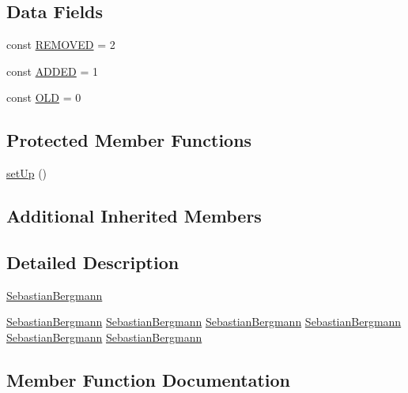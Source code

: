 \subsection*{Data Fields}
\begin{DoxyCompactItemize}
\item 
const \mbox{\hyperlink{class_sebastian_bergmann_1_1_diff_1_1_differ_test_a407d200e9f16e51a21be57a9fcec09f0}{R\+E\+M\+O\+V\+ED}} = 2
\item 
const \mbox{\hyperlink{class_sebastian_bergmann_1_1_diff_1_1_differ_test_a9dcf44632176616f583582396a5d6ec9}{A\+D\+D\+ED}} = 1
\item 
const \mbox{\hyperlink{class_sebastian_bergmann_1_1_diff_1_1_differ_test_aa3c960620355380babe787deab5a9b4e}{O\+LD}} = 0
\end{DoxyCompactItemize}
\subsection*{Protected Member Functions}
\begin{DoxyCompactItemize}
\item 
\mbox{\hyperlink{class_sebastian_bergmann_1_1_diff_1_1_differ_test_a0bc688732d2b3b162ffebaf7812e78da}{set\+Up}} ()
\end{DoxyCompactItemize}
\subsection*{Additional Inherited Members}


\subsection{Detailed Description}
\mbox{\hyperlink{namespace_sebastian_bergmann}{Sebastian\+Bergmann}}

\mbox{\hyperlink{namespace_sebastian_bergmann}{Sebastian\+Bergmann}}  \mbox{\hyperlink{namespace_sebastian_bergmann}{Sebastian\+Bergmann}}  \mbox{\hyperlink{namespace_sebastian_bergmann}{Sebastian\+Bergmann}}  \mbox{\hyperlink{namespace_sebastian_bergmann}{Sebastian\+Bergmann}}  \mbox{\hyperlink{namespace_sebastian_bergmann}{Sebastian\+Bergmann}}  \mbox{\hyperlink{namespace_sebastian_bergmann}{Sebastian\+Bergmann}} 

\subsection{Member Function Documentation}
\mbox{\label{class_sebastian_bergmann_1_1_diff_1_1_differ_test_a119710504ca0e9909a2e5ad35ca148de}} 
